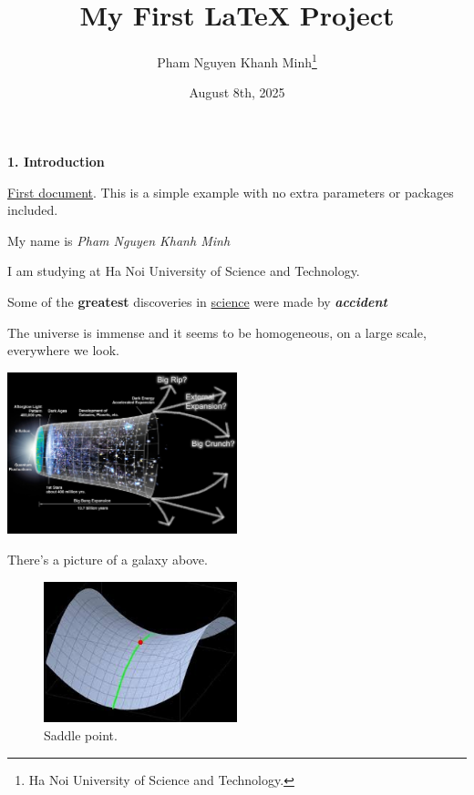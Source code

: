 \documentclass[12pt, letterpaper]{article}
\title{My First \LaTeX{} Project}
\author{Pham Nguyen Khanh Minh\thanks{Ha Noi University of Science and Technology.}}
\date{August 8th, 2025}
\begin{document}
\maketitle

\textbf{1. Introduction}


\underline{First document}. This is a simple example with no
extra parameters or packages included.



My name is \textit{Pham Nguyen Khanh Minh}



I am studying at Ha Noi University of Science and Technology. 

\bigskip 

Some of the \textbf{greatest} discoveries in \underline{science} were made by \textbf{\textit{accident}}

\bigskip 

The universe is immense and it seems to be homogeneous, 
on a large scale, everywhere we look.

\begin{center}
\includegraphics[width=0.5\textwidth]{universe.jpg} 
\end{center}
There's a picture of a galaxy above.

\bigskip

\begin{figure}[ht]
    \centering
    \includegraphics[width=0.5\textwidth]{images/mesh.jpg}
    \caption{Saddle point.}
    \label{fig:mesh1} 
\end{figure}
\end{document}
